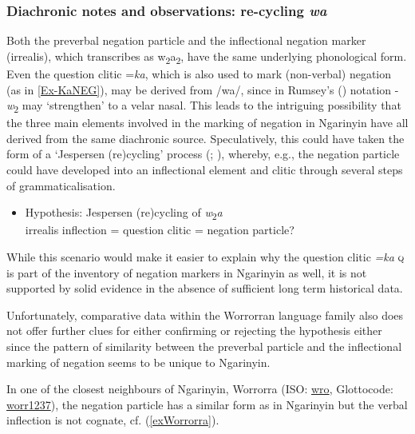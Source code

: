 \documentclass[output=paper,colorlinks,citecolor=brown]{langscibook}
\begin{document}
\subsubsection{Diachronic notes and observations: re-cycling \textit{wa}} \label{subsDiachrony}

Both the preverbal negation particle and the inflectional negation marker (irrealis), which \citet{Rumsey1982} transcribes as w\textsubscript{2}a\textsubscript{2}, have the same underlying phonological form. Even the question clitic =\textit{ka}, which is also used to mark (non-verbal) negation (as in \ref{Ex-KaNEG}), may be derived from /wa/, since in Rumsey's (\citeyear{Rumsey1982}) notation -\textit{w}\textsubscript{2} may `strengthen' to a velar nasal. This leads to the intriguing possibility that the three main elements involved in the marking of negation in Ngarinyin have all derived from the same diachronic source. Speculatively, this could have taken the form of a `Jespersen (re)cycling' process (\citealt{Jespersen1917}; \citealt{Dahl1979}), whereby, e.g., the negation particle could have developed into an inflectional element and clitic through several steps of grammaticalisation.

\begin{itemize}
  \item Hypothesis: Jespersen (re)cycling of \textit{w}\textsubscript{2}\textit{a}\\
  irrealis inflection = question clitic \citep[128]{Rumsey1982} = negation particle?
\end{itemize}

While this scenario would make it easier to explain why the question clitic \textit{=ka} \textsc{q} is part of the inventory of negation markers in Ngarinyin as well, it is not supported by solid evidence in the absence of sufficient long term historical data.

Unfortunately, comparative data within the Worrorran language family \citep{McGregorRumsey2009} also does not offer further clues for either confirming or rejecting the hypothesis either since the pattern of similarity between the preverbal particle and the inflectional marking of negation seems to be unique to Ngarinyin.

In one of the closest neighbours of Ngarinyin, Worrorra (ISO: \href{https://iso639-3.sil.org/code/wro}{wro}, Glottocode: \href{https://glottolog.org/resource/languoid/id/worr1237}{worr1237}), the negation particle has a similar form as in Ngarinyin but the verbal inflection is not cognate, cf. (\ref{exWorrorra}).
\end{document}
